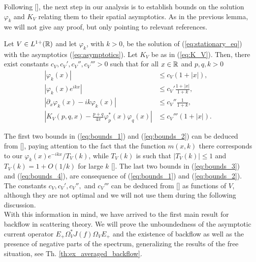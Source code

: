 Following [\citealp{gand}], the next step in our analysis is to establish bounds on the solution $\varphi_k$ and $K_V$ relating them to their spatial asymptotics. As in the previous lemma, we will not give any proof, but only pointing to relevant references.
\begin{lem}
	\label{lem:bounds}
	Let $V\in L^{1+}({\mathbb R})$ and let $\varphi_k$, with $k>0$, be the solution of (\ref{eq:stationary_eq}) with the asymptotics (\ref{eq:asymptotics}). Let $K_V$ be as in (\ref{eq:K_V}). Then, there exist constants $c_V,c_V',c_V'',c_V'''>0$ such that for all $x\in{\mathbb R}$ and $p,q,k>0$
	\begin{align}
	|\varphi_k(x)|&\le c_V(1+|x|), \label{eq:bounds_1}\\
	 |\varphi_k(x)e^{ikx}|&\le c_V'\frac{1+|x|}{1+k}, \label{eq:bounds_2}\\
	 |\partial_x\varphi_k(x)-ik\varphi_k(x)|&\le c_V''\frac{1}{1+k}, \label{eq:bounds_3}\\
	 \left|K_V(p,q,x)-\frac{p+q}{4\pi}\varphi_p^*(x)\varphi_q(x)\right|&\le c_V'''(1+|x|). \label{eq:bounds_4}
	\end{align}
\end{lem}
The first two bounds in (\ref{eq:bounds_1}) and (\ref{eq:bounds_2}) can be deduced from [\citealp[Sec. 2, Lemma 1]{deift}], paying attention to the fact that the function $m(x,k)$ there corresponds to our $\varphi_k(x)e^{-ikx}/T_V(k)$, while $T_V(k)$ is such that $|T_V(k)|\le1$ and $T_V(k)=1+O(1/k)$ for large $k$ [\citealp[Sec. 2, Theorem 1]{deift}]. The last two bounds in (\ref{eq:bounds_3}) and (\ref{eq:bounds_4}), are consequence of (\ref{eq:bounds_1}) and (\ref{eq:bounds_2}). The constants $c_V,c_V',c_V'',$ and $c_V'''$ can be deduced from [\citealp{deift}] as functions of $V$, although they are not optimal and we will not use them during the following discussion.\\
With this information in mind, we have arrived to the first main result for backflow in scattering theory. We will prove the unboundedness of the asymptotic current operator $E_+\Omega_V^*J(f)\Omega_VE_+$ and the existence of backflow as well as the presence of negative parts of the spectrum, generalizing the results of the free situation, see Th. \ref{th:ex_averaged_backflow}.

